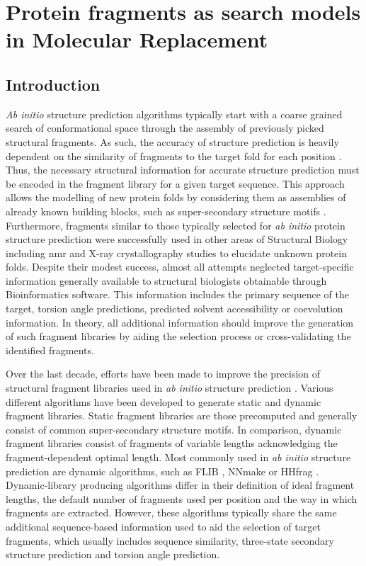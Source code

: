 \chapter{Protein fragments as search models in Molecular Replacement} \label{chap:ample_flib}
\clearpage

\section{Introduction}
\textit{Ab initio} structure prediction algorithms typically start with a coarse grained search of conformational space through the assembly of previously picked structural fragments. As such, the accuracy of structure prediction is heavily dependent on the similarity of fragments to the target fold for each position \cite{Gront2011-sv}. Thus, the necessary structural information for accurate structure prediction must be encoded in the fragment library for a given target sequence. This approach allows the modelling of new protein folds by considering them as assemblies of already known building blocks, such as super-secondary structure motifs \cite{Fernandez-Fuentes2010-ea}. Furthermore, fragments similar to those typically selected for \textit{ab initio} protein structure prediction were successfully used in other areas of Structural Biology including \gls{nmr} \cite{Delaglio2000-fx,Kontaxis2005-ea} and X-ray crystallography \cite{Jones1986-rd} studies to elucidate unknown protein folds. Despite their modest success, almost all attempts neglected target-specific information generally available to structural biologists obtainable through Bioinformatics software. This information includes the primary sequence of the target, torsion angle predictions, predicted solvent accessibility or coevolution information. In theory, all additional information should improve the generation of such fragment libraries by aiding the selection process or cross-validating the identified fragments.

Over the last decade, efforts have been made to improve the precision of structural fragment libraries used in \textit{ab initio} structure prediction \cite{Abbass2015-qk,Shen2013-wh,Li2008-xu,Kalev2011-sz,Bhattacharya2016-ix,Wang2017-ka,De_Oliveira2015-kb,Gront2011-sv}. Various different algorithms have been developed to generate static and dynamic fragment libraries. Static fragment libraries are those precomputed and generally consist of common super-secondary structure motifs. In comparison, dynamic fragment libraries consist of fragments of variable lengths acknowledging the fragment-dependent optimal length. Most commonly used in \textit{ab initio} structure prediction are dynamic algorithms, such as FLIB \cite{De_Oliveira2015-kb}, NNmake \cite{Gront2011-sv} or HHfrag \cite{Kalev2011-sz}. Dynamic-library producing algorithms differ in their definition of ideal fragment lengths, the default number of fragments used per position and the way in which fragments are extracted. However, these algorithms typically share the same additional sequence-based information used to aid the selection of target fragments, which usually includes sequence similarity, three-state secondary structure prediction and torsion angle prediction.


